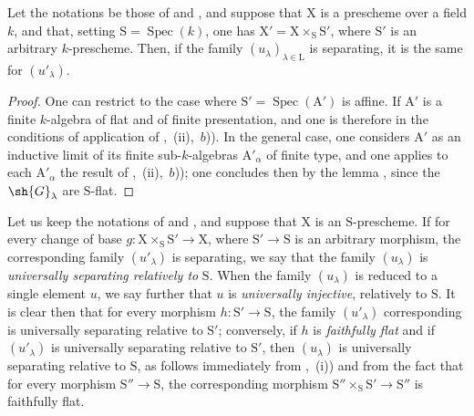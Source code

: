 \begin{proposition}[11.9.13]
\label{IV.11.9.13}
Let the notations be those of  and , and suppose that $\mathrm{X}$ is a prescheme over a field $k$, and that, setting $\mathrm{S}=\operatorname{Spec}(k)$, one has $\mathrm{X}'=\mathrm{X}\times_\mathrm{S}\mathrm{S}'$, where $\mathrm{S}'$ is an arbitrary $k$-prescheme.
Then, if the family $(u_\lambda)_{\lambda\in\mathrm{L}}$ is separating, it is the same for $(u'_\lambda)$.
\end{proposition}

\begin{proof}
One can restrict to the case where $\mathrm{S}'=\operatorname{Spec}(\mathrm{A}')$ is affine.
If $\mathrm{A}'$ is a finite $k$-algebra of flat and of finite presentation, and one is therefore in the conditions of application of ,~(ii),~$b$)).
In the general case, one considers $\mathrm{A}'$ as an inductive limit of its finite sub-$k$-algebras $\mathrm{A}'_\alpha$ of finite type, and one applies to each $\mathrm{A}'_\alpha$ the result of ,~(ii),~$b$)); one concludes then by the lemma , since the $\sh{G}_\lambda$ are $\mathrm{S}$-flat.
\end{proof}

\begin{env}[11.9.14]
\label{IV.11.9.14}
Let us keep the notations of  and , and suppose that $\mathrm{X}$ is an $\mathrm{S}$-prescheme.
If for every change of base $g:\mathrm{X}\times_\mathrm{S}\mathrm{S}'\to\mathrm{X}$, where $\mathrm{S}'\to\mathrm{S}$ is an arbitrary morphism, the corresponding family $(u'_\lambda)$ is separating, we say that the family $(u_\lambda)$ is \emph{universally separating relatively to} $\mathrm{S}$.
When the family $(u_\lambda)$ is reduced to a single element $u$, we say further that $u$ is \emph{universally injective}, relatively to $\mathrm{S}$.
It is clear then that for every morphism $h:\mathrm{S}'\to\mathrm{S}$, the family $(u'_\lambda)$ corresponding is universally separating relative to $\mathrm{S}'$; conversely, if $h$ is \emph{faithfully flat} and if $(u'_\lambda)$ is universally separating relative to $\mathrm{S}'$, then $(u_\lambda)$ is universally separating relative to $\mathrm{S}$, as follows immediately from ,~(i)) and from the fact that for every morphism $\mathrm{S}''\to\mathrm{S}$, the corresponding morphism $\mathrm{S}''\times_\mathrm{S}\mathrm{S}'\to\mathrm{S}''$ is faithfully flat.
\end{env}


